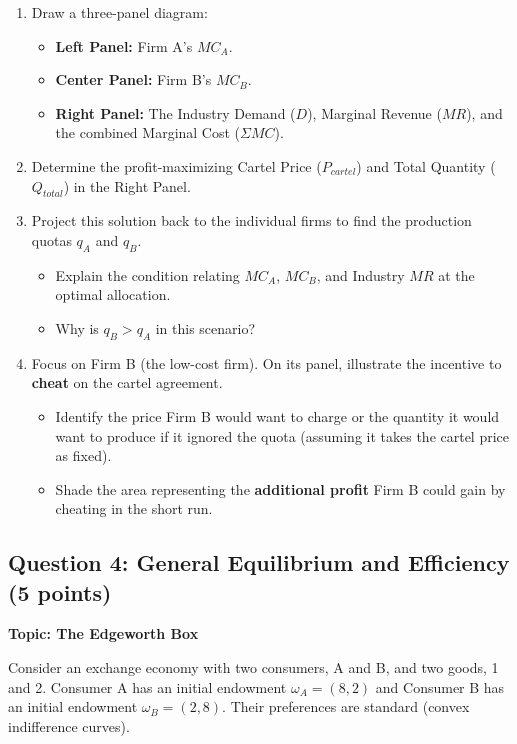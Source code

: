 \documentclass[12pt, a4paper]{article}
\begin{document}
\begin{enumerate}
    \item[(a)] Draw a three-panel diagram:
    \begin{itemize}
        \item \textbf{Left Panel:} Firm A's $MC_A$.
        \item \textbf{Center Panel:} Firm B's $MC_B$.
        \item \textbf{Right Panel:} The Industry Demand ($D$), Marginal Revenue ($MR$), and the combined Marginal Cost ($\Sigma MC$).
    \end{itemize}
    \item[(b)] Determine the profit-maximizing Cartel Price ($P_{cartel}$) and Total Quantity ($Q_{total}$) in the Right Panel.
    \item[(c)] Project this solution back to the individual firms to find the production quotas $q_A$ and $q_B$.
    \begin{itemize}
        \item Explain the condition relating $MC_A$, $MC_B$, and Industry $MR$ at the optimal allocation.
        \item Why is $q_B > q_A$ in this scenario?
    \end{itemize}
    \item[(d)] Focus on Firm B (the low-cost firm). On its panel, illustrate the incentive to \textbf{cheat} on the cartel agreement.
    \begin{itemize}
        \item Identify the price Firm B would want to charge or the quantity it would want to produce if it ignored the quota (assuming it takes the cartel price as fixed).
        \item Shade the area representing the \textbf{additional profit} Firm B could gain by cheating in the short run.
    \end{itemize}
\end{enumerate}

\vspace{0.5cm}

\subsection*{Question 4: General Equilibrium and Efficiency (5 points)}
\textbf{Topic: The Edgeworth Box}

Consider an exchange economy with two consumers, A and B, and two goods, 1 and 2. Consumer A has an initial endowment $\omega_A = (8, 2)$ and Consumer B has an initial endowment $\omega_B = (2, 8)$. Their preferences are standard (convex indifference curves).
\end{document}
